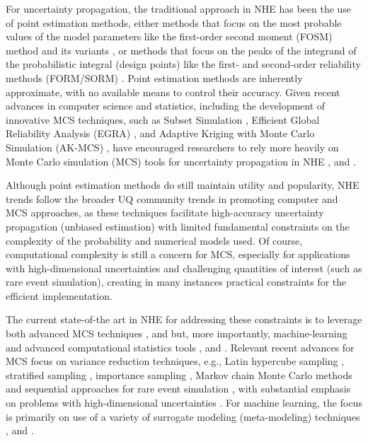 For uncertainty propagation, the traditional approach in NHE has been the use of point estimation methods, either methods that focus on the most probable values of the model parameters like the first-order second moment (FOSM) method \citep{baker2008uncertainty} and its variants \citep{vamvatsikos2013derivation}, or methods that focus on the peaks of the integrand of the probabilistic integral (design points) like the first- and second-order reliability methods (FORM/SORM) \citep{koduru2010feasibility}. Point estimation methods are inherently approximate, with no available means to control their accuracy. Given recent advances in computer science and statistics, including the development of innovative MCS techniques, such as Subset Simulation \citep{au2003subset}, Efficient Global Reliability Analysis (EGRA) \citep{bichon2013efficient}, and Adaptive Kriging with Monte Carlo Simulation (AK-MCS) \citep{echard2011akmcs}, have encouraged researchers to rely more heavily on Monte Carlo simulation (MCS) tools for uncertainty propagation in NHE \citep{smith2011monte, taflanidis2011simulationbased, vamvatsikos2014seismic, esposito2015simulation}, and \citep{deb2019parametric}. 

Although point estimation methods do still maintain utility and popularity, NHE trends follow the broader UQ community trends in promoting computer and MCS approaches, as these techniques facilitate high-accuracy uncertainty propagation (unbiased estimation) with limited fundamental constraints on the complexity of the probability and numerical models used. Of course, computational complexity is still a concern for MCS, especially for applications with high-dimensional uncertainties and challenging quantities of interest (such as rare event simulation), creating in many instances practical constraints for the efficient implementation.

The current state-of-the art in NHE for addressing these constraints is to leverage both advanced MCS techniques \citep{au2003subset,li2017system}, and \citep{bansal2018subset} but, more importantly, machine-learning and advanced computational statistics tools \citep{echard2011akmcs, abbiati2017hierarchical, ding2018multifidelity, su2018efficient}, and \citep{wang2018bayesian}. Relevant recent advances for MCS focus on variance reduction techniques, e.g., Latin hypercube sampling \citep{vamvatsikos2014seismic}, stratified sampling \citep{jayaram2010efficient}, importance sampling \citep{papaioannou2018reliability}, Markov chain Monte Carlo methods \citep{au2003subset} and sequential approaches for rare event simulation \citep{jia2017new}, with substantial emphasis on problems with high-dimensional uncertainties \citep{au2003subset,wang2016crossentropybased}. For machine learning, the focus is primarily on use of a variety of surrogate modeling (meta-modeling) techniques \citep{stern2017accelerated, zhang2018adaptive, bernier2019fragility, gentile2020gaussian, le2020neural}, and \citep{zhang2020physicsguided}.


